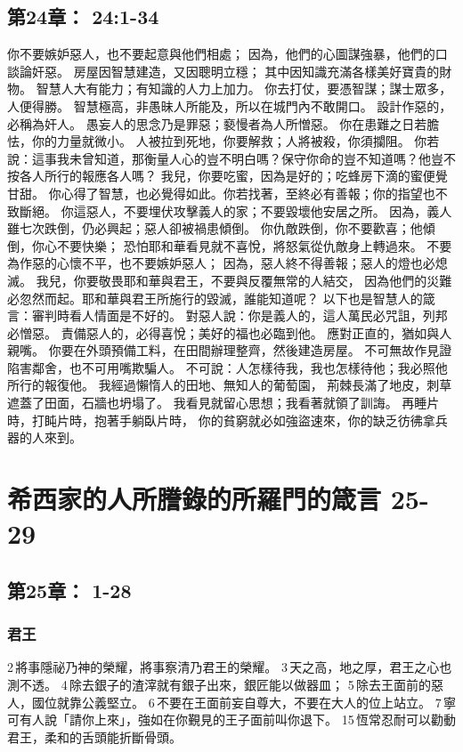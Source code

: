 \subsection{第24章： 24:1-34}
你不要嫉妒惡人，也不要起意與他們相處；
因為，他們的心圖謀強暴，他們的口談論奸惡。
房屋因智慧建造，又因聰明立穩；
其中因知識充滿各樣美好寶貴的財物。
智慧人大有能力；有知識的人力上加力。
你去打仗，要憑智謀；謀士眾多，人便得勝。
智慧極高，非愚昧人所能及，所以在城門內不敢開口。
設計作惡的，必稱為奸人。
愚妄人的思念乃是罪惡；褻慢者為人所憎惡。
你在患難之日若膽怯，你的力量就微小。
人被拉到死地，你要解救；人將被殺，你須攔阻。
你若說：這事我未曾知道，那衡量人心的豈不明白嗎？保守你命的豈不知道嗎？他豈不按各人所行的報應各人嗎？
我兒，你要吃蜜，因為是好的；吃蜂房下滴的蜜便覺甘甜。
你心得了智慧，也必覺得如此。你若找著，至終必有善報；你的指望也不致斷絕。
你這惡人，不要埋伏攻擊義人的家；不要毀壞他安居之所。
因為，義人雖七次跌倒，仍必興起；惡人卻被禍患傾倒。
你仇敵跌倒，你不要歡喜；他傾倒，你心不要快樂；
恐怕耶和華看見就不喜悅，將怒氣從仇敵身上轉過來。
不要為作惡的心懷不平，也不要嫉妒惡人；
因為，惡人終不得善報；惡人的燈也必熄滅。
我兒，你要敬畏耶和華與君王，不要與反覆無常的人結交，
因為他們的災難必忽然而起。耶和華與君王所施行的毀滅，誰能知道呢？
以下也是智慧人的箴言：審判時看人情面是不好的。
對惡人說：你是義人的，這人萬民必咒詛，列邦必憎惡。
責備惡人的，必得喜悅；美好的福也必臨到他。
應對正直的，猶如與人親嘴。
你要在外頭預備工料，在田間辦理整齊，然後建造房屋。
不可無故作見證陷害鄰舍，也不可用嘴欺騙人。
不可說：人怎樣待我，我也怎樣待他；我必照他所行的報復他。
我經過懶惰人的田地、無知人的葡萄園，
荊棘長滿了地皮，刺草遮蓋了田面，石牆也坍塌了。
我看見就留心思想；我看著就領了訓誨。
再睡片時，打盹片時，抱著手躺臥片時，
你的貧窮就必如強盜速來，你的缺乏彷彿拿兵器的人來到。

\section{希西家的人所謄錄的所羅門的箴言 25-29}
\subsection{第25章： 1-28}
\subsubsection{君王}
2 將事隱祕乃神的榮耀，將事察清乃君王的榮耀。 3 天之高，地之厚，君王之心也測不透。 4 除去銀子的渣滓就有銀子出來，銀匠能以做器皿； 5 除去王面前的惡人，國位就靠公義堅立。 6 不要在王面前妄自尊大，不要在大人的位上站立。 7 寧可有人說「請你上來」，強如在你覲見的王子面前叫你退下。 
15 恆常忍耐可以勸動君王，柔和的舌頭能折斷骨頭。


